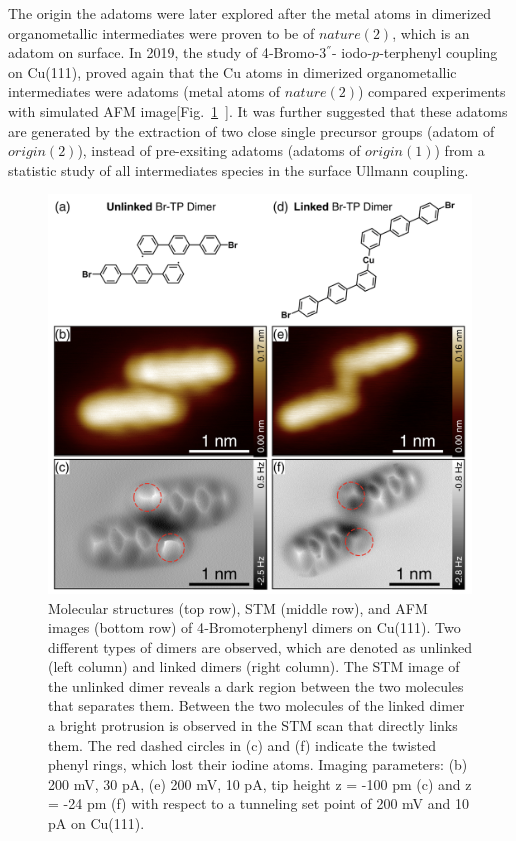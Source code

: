 \documentclass[%
 reprint,
 amsmath,amssymb,
 aps,
prb,
]{revtex4-2}
\begin{document}
The origin the adatoms were later explored after the metal atoms in dimerized organometallic intermediates were proven to be of $nature(2)$, which is an adatom on surface. In 2019, the study of 4‐Bromo-3$^{''}$- iodo‐$p$‐terphenyl coupling on Cu(111), proved again that the Cu atoms in dimerized organometallic intermediates were adatoms (metal atoms of $nature(2)$) compared experiments with simulated AFM image[Fig.~\ref{fig:6}~\cite{acsnano2019}]. It was further suggested that these adatoms are generated by the extraction of two close single precursor groups (adatom of $origin(2)$), instead of pre-exsiting adatoms (adatoms of $origin(1)$) from a statistic study of all intermediates species in the surface Ullmann coupling.
%
\begin{figure}[ht]
\centering
\includegraphics[width=0.75\columnwidth]{Fig/AFM_prove.png}
\caption{Molecular structures (top row), STM (middle row), and AFM images (bottom row) of 4‐Bromoterphenyl dimers on Cu(111). Two different types of dimers are observed, which are denoted as unlinked (left column) and linked dimers (right column). The STM image of the unlinked dimer reveals a dark region between the two molecules that separates them. Between the two molecules of the linked dimer a bright protrusion is observed in the STM scan that directly links them. The red dashed circles in (c) and (f) indicate the twisted phenyl rings, which lost their iodine atoms. Imaging parameters: (b) 200 mV, 30 pA, (e) 200 mV, 10 pA, tip height z = -100 pm (c) and z = -24 pm (f) with respect to a tunneling set point of 200 mV and 10 pA on Cu(111).}
\label{fig:6}
\end{figure}
\end{document}
